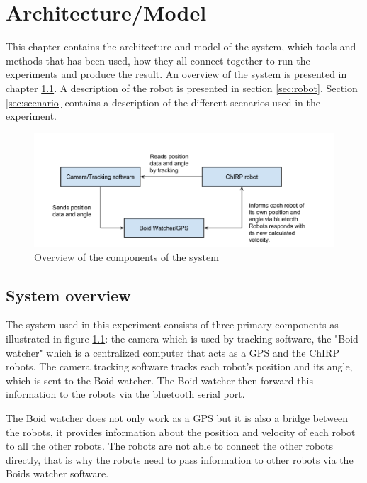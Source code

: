 \chapter{Architecture/Model}
\label{cha:architectureAndModel}
This chapter contains the architecture and model of the system, which tools and methods that has been used, how they all connect together to run the experiments and produce the result.
An overview of the system is presented in chapter \ref{sec:overview}. A description of the robot is presented in section \ref{sec:robot}. Section \ref{sec:scenario} contains a description of the different scenarios used in the experiment.

\begin{figure}[h]
\begin{center}
\includegraphics[width=\linewidth]{figs/system_overview}
\end{center}
\caption[System overview]{Overview of the components of the system}
\label{fig:overview}
\end{figure}

\section{System overview}
\label{sec:overview}

The system used in this experiment consists of three primary components as illustrated in figure \ref{fig:overview}: the camera which is used by tracking software, the "Boid-watcher" which is a centralized computer that acts as a GPS and the ChIRP robots.
The camera tracking software tracks each robot's position and its angle, which is sent to the Boid-watcher. The Boid-watcher then forward this information to the robots via the bluetooth serial port.

The Boid watcher does not only work as a GPS but it is also a bridge between the robots, it provides information about the position and velocity of each robot to all the other robots. The robots are not able to connect the other robots directly, that is why the robots need to pass information to other robots via the Boids watcher software.

